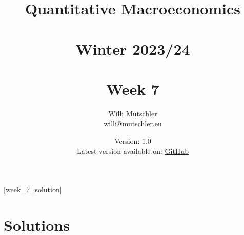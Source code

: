 
\newif\ifDisplaySolutions\DisplaySolutionstrue


\title{Quantitative Macroeconomics\\~\\Winter 2023/24\\~\\Week 7}
\author{Willi Mutschler\\willi@mutschler.eu}
\date{Version: 1.0\\Latest version available on: \href{https://github.com/wmutschl/Quantitative-Macroeconomics/releases/latest/download/week_7.pdf}{GitHub}}
\maketitle\thispagestyle{empty}

\newpage
{}[week_7_solution]
\tableofcontents\thispagestyle{empty}\newpage

\setcounter{page}{1}
\newpage
\newpage
\newpage
\printbibliography
\newpage

\ifDisplaySolutions
\newpage
\appendix
\section{Solutions}

\fi
